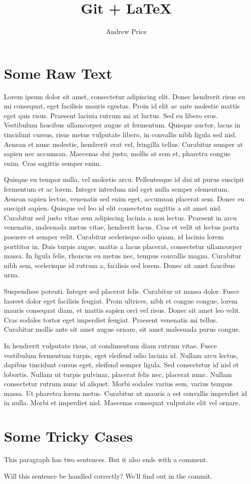 \documentclass[12pt,twocolumn,letter]{article}
\begin{document}
\title{Git + \LaTeX}
\author{Andrew Price}
\maketitle

\section{Some Raw Text}
Lorem ipsum dolor sit amet, consectetur adipiscing elit. %
Donec hendrerit risus eu mi consequat, eget facilisis mauris egestas. %
Proin id elit ac ante molestie mattis eget quis risus. %
Praesent lacinia rutrum mi at luctus. %
Sed eu libero eros. %
Vestibulum faucibus ullamcorper augue at fermentum. %
Quisque auctor, lacus in tincidunt cursus, risus metus vulputate libero, in convallis nibh ligula sed nisl. %
Aenean et nunc molestie, hendrerit erat vel, fringilla tellus. %
Curabitur semper at sapien nec accumsan. %
Maecenas dui justo, mollis at sem et, pharetra congue enim. %
Cras sagittis semper enim.

Quisque eu tempor nulla, vel molestie arcu. %
Pellentesque id dui ut purus suscipit fermentum et ac lorem. %
Integer interdum nisl eget nulla semper elementum. %
Aenean sapien lectus, venenatis sed enim eget, accumsan placerat sem. %
Donec eu suscipit sapien. %
Quisque vel leo id elit consectetur sagittis a sit amet nisl. %
Curabitur sed justo vitae sem adipiscing lacinia a non lectus. %
Praesent in arcu venenatis, malesuada metus vitae, hendrerit lacus. %
Cras et velit ut lectus porta posuere et semper velit. %
Curabitur scelerisque odio quam, id lacinia lorem porttitor in. %
Duis turpis augue, mattis a lacus placerat, consectetur ullamcorper massa. %
In ligula felis, rhoncus eu metus nec, tempus convallis magna. %
Curabitur nibh sem, scelerisque id rutrum a, facilisis sed lorem. %
Donec sit amet faucibus urna.

Suspendisse potenti. %
Integer sed placerat felis. %
Curabitur ut massa dolor. %
Fusce laoreet dolor eget facilisis feugiat. %
Proin ultrices, nibh et congue congue, lorem mauris consequat diam, et mattis sapien orci vel risus. %
Donec sit amet leo velit. %
Cras sodales tortor eget imperdiet feugiat. %
Praesent venenatis mi tellus. %
Curabitur mollis ante sit amet augue ornare, sit amet malesuada purus congue.

In hendrerit vulputate risus, at condimentum diam rutrum vitae. %
Fusce vestibulum fermentum turpis, eget eleifend odio lacinia id. %
Nullam arcu lectus, dapibus tincidunt cursus eget, eleifend semper ligula. %
Sed consectetur id nisl et lobortis. %
Nullam ut turpis pulvinar, placerat felis nec, placerat nunc. %
Nullam consectetur rutrum nunc id aliquet. %
Morbi sodales varius sem, varius tempus massa. %
Ut pharetra lorem metus. %
Curabitur ut mauris a est convallis imperdiet id in nulla. %
Morbi et imperdiet nisl. %
Maecenas consequat vulputate elit vel ornare.


\section{Some Tricky Cases}

This paragraph has two sentences. But it also ends with a comment. %

Will this sentence be handled correctly? %
We'll find out in the commit.
\end{document}
